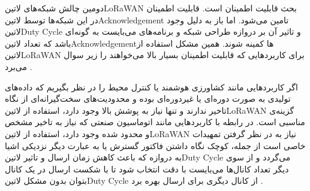دومین چالش شبکه‌های ‌لاتین{LoRaWAN} بحث قابلیت اطمینان است. قابلیت اطمینان در این شبکه‌ها توسط ‌لاتین{Acknowledgement} تامین می‌شود.
اما باز به دلیل وجود ‌لاتین{Duty Cycle} و تاثیر آن بر دروازه طراحی شبکه و برنامه‌های می‌بایست به گونه‌ای باشد که تعداد ‌لاتین{Acknowledgement}ها کمینه شوند.
همین مشکل استفاده از ‌لاتین{LoRaWAN} برای کاربردهایی که قابلیت اطمینان بسیار بالا می‌خواهند را زیر سوال می‌برد
.

اگر کاربردهایی مانند کشاورزی هوشمند یا کنترل محیط را در نظر بگیریم که داده‌های تولیدی به صورت دوره‌ای یا غیردوره‌ای بوده و محدودیت‌های سخت‌گیرانه‌ای از نگاه تاخیر ندارند و تنها نیاز به پوشش بالا وجود دارد،
استفاده از ‌لاتین{LoRaWAN} گزینه‌ی مناسبی است. در رابطه با کاربردهایی مانند اتوماسیون صنعتی که نیاز به تاخیر مشخص و محدود شده وجود دارد، استفاده از ‌لاتین{LoRaWAN} نیاز به در نظر گرفتن تمهیدات
خاصی است از جمله، کوچک نگاه داشتن فاکتور گسترش یا به عبارت دیگر نزدیکی اشیا به دروازه که باعث کاهش زمان ارسال و تاثیر ‌لاتین{Duty Cycle} می‌گردد و از سوی دیگر تعداد کانال‌ها می‌بایست
با دقت انتخاب شود تا با شکست ارسال در یک کانال بتوان بدون مشکل ‌لاتین{Duty Cycle} از کانال دیگری برای ارسال بهره برد
.
